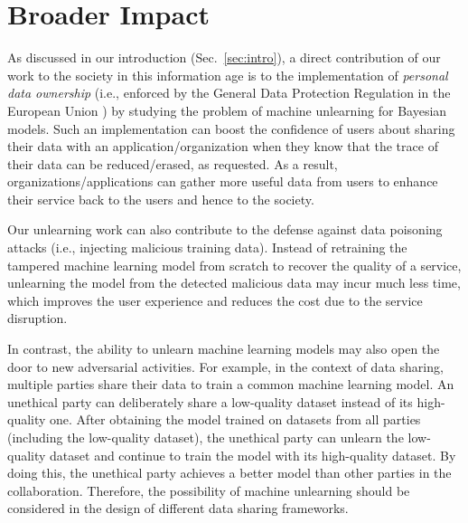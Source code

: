 \documentclass{article}
\theoremstyle{definition}
\begin{document}
\clearpage
\section*{Broader Impact}


As discussed in our introduction (Sec.~\ref{sec:intro}), a direct contribution of our work to the society in this information age is to the implementation of \emph{personal data ownership} (i.e., enforced by the General Data Protection Regulation in the European Union \cite{mantelero2013eu}) by studying the problem of machine unlearning for Bayesian models. Such an implementation can boost the confidence of users about sharing their data with an application/organization when they know that the trace of their data can be reduced/erased, as requested.
As a result, organizations/applications can gather more useful data from users to enhance their service back to the users and hence to the society.

Our unlearning work can also contribute to the defense against data poisoning attacks (i.e., injecting malicious training data). Instead of retraining the tampered machine learning model from scratch to recover the quality of a service, unlearning the model from the detected malicious data may incur much less time, which improves the user experience and reduces the cost due to the service disruption.

In contrast, the ability to unlearn machine learning models may also open the door to new adversarial activities. For example, in the context of data sharing, multiple parties share their data to train a common machine learning model. An unethical party can deliberately share a low-quality dataset instead of its high-quality one. After obtaining the model trained on datasets from all parties (including the low-quality dataset), the unethical party can unlearn the low-quality dataset and continue to train the model with its high-quality dataset.
By doing this, the unethical party achieves a better model than other parties in the collaboration. Therefore, the possibility of machine unlearning should be considered in the design of different data sharing frameworks.
\end{document}

